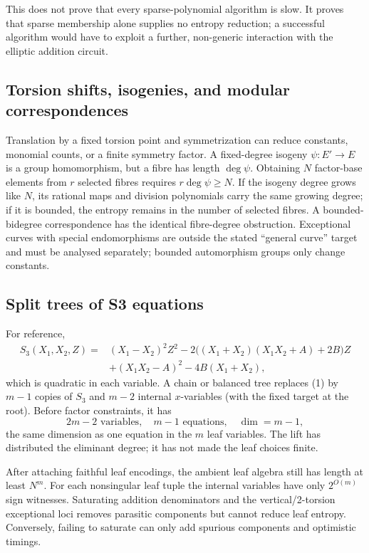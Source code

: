 \documentclass[11pt]{article}
\begin{document}
This does not prove that every sparse-polynomial algorithm is slow.  It proves %
that sparse membership alone supplies no entropy reduction; a successful
algorithm would have to exploit a further, non-generic interaction with the
elliptic addition circuit.

\subsection{Torsion shifts, isogenies, and modular correspondences}

Translation by a fixed torsion point and symmetrization can reduce constants,
monomial counts, or a finite symmetry factor.  A fixed-degree isogeny
$\psi:E'\to E$ is a group homomorphism, but a fibre has length $\deg\psi$.
Obtaining $N$ factor-base elements from $r$ selected fibres requires
$r\deg\psi\ge N$.  If the isogeny degree grows like $N$, its rational maps and
division polynomials carry the same growing degree; if it is bounded, the
entropy remains in the number of selected fibres.  A bounded-bidegree
correspondence has the identical fibre-degree obstruction.  Exceptional curves
with special endomorphisms are outside the stated ``general curve'' target and
must be analysed separately; bounded automorphism groups only change constants.

\subsection{Split trees of S3 equations}

For reference,
\begin{align*}
S_3(X_1,X_2,Z)={}&(X_1-X_2)^2Z^2
-2\big((X_1+X_2)(X_1X_2+A)+2B\big)Z\\
&+(X_1X_2-A)^2-4B(X_1+X_2),
\end{align*}
which is quadratic in each variable.  A chain or balanced tree replaces (1)
by $m-1$ copies of $S_3$ and $m-2$ internal $x$-variables (with the fixed target
at the root).  Before factor constraints, it has
\[
 2m-2\text{ variables},\quad m-1\text{ equations},\quad
 \dim=m-1,                                                         \tag{15}
\]
the same dimension as one equation in the $m$ leaf variables.  The lift has
distributed the eliminant degree; it has not made the leaf choices finite.

After attaching faithful leaf encodings, the ambient leaf algebra still has
length at least $N^m$.  For each nonsingular leaf tuple the internal variables
have only $2^{O(m)}$ sign witnesses.  Saturating addition denominators and the
vertical/2-torsion exceptional loci removes parasitic components but cannot
reduce leaf entropy.  Conversely, failing to saturate can only add spurious
components and optimistic timings.
\end{document}
